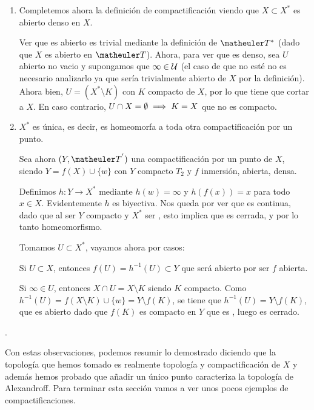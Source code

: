 \begin{obs}
\begin{enumerate}
		\item Completemos ahora la definición de compactificación viendo que $X\subset X^*$ es abierto denso en $X$. 
		
		Ver que es abierto es trivial mediante la definición de $\T^*$ (dado que $X$ es abierto en $\T$). Ahora, para ver que es denso, sea $U$ abierto no vacio y supongamos que $\infty\in\mathcal{U}$ (el caso de que no esté no es necesario analizarlo ya que sería trivialmente abierto de $X$ por la definición). Ahora bien, $U=(X^*\setminus K)$ con $K$ compacto de $X$, por lo que tiene que cortar a $X$. En caso contrario, $U\cap X=\emptyset\implies K=X$ que no es compacto.
		
		
		\item $X^*$ es única, es decir, es homeomorfa a toda otra compactificación por un punto.
		
		Sea ahora $(Y,\T^{'})$  una compactificación por un punto de $X$, siendo $Y= f(X) \cup \{w\}$ con $Y$ compacto $T_2$ y $f$ inmersión, abierta, densa.
		
		Definimos $h : Y \longrightarrow X^*$ mediante $h(w) = \infty$ y $h(f(x)) = x$ para todo $x \in X$. Evidentemente $h$ es biyectiva. Nos queda por ver que es continua, dado que al ser $Y$ compacto y $X^*$ ser \hausdorff, esto implica que es cerrada, y por lo tanto homeomorfismo.
		
		Tomamos $U\subset X^*$, vayamos ahora por casos:
		
		Si $U\subset X$, entonces $f(U)=h^{-1}(U)\subset Y$ que será abierto por ser $f$ abierta.
		
		Si $\infty\in U$, entonces $X\cap U=X\setminus K$ siendo $K$ compacto. Como $h^{-1}(U)=f(X\setminus K)\cup \{w\}=Y\setminus f(K)$, se tiene que $h^{-1}(U)=Y\setminus f(K)$, que es abierto dado que $f(K)$ es compacto en $Y$ que es \hausdorff, luego es cerrado.
	\end{enumerate}.
\end{obs}
Con estas observaciones, podemos resumir lo demostrado diciendo que la topología que hemos tomado es realmente topología y compactificación de $X$ y además hemos probado que añadir un único punto caracteriza la topología de Alexandroff. Para terminar esta sección vamos a ver unos pocos ejemplos de compactificaciones.
